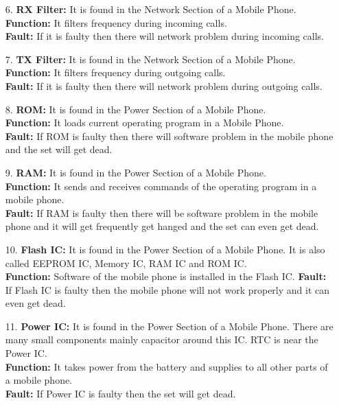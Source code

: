 \begin{itemize}
\item[6.] \textbf{RX Filter:} It is found in the Network Section of a Mobile Phone.\\
\textbf{Function:} It filters frequency during incoming calls.\\
\textbf{Fault:} If it is faulty then there will network problem during incoming
calls.

\item[7.] \textbf{TX Filter:} It is found in the Network Section of a Mobile Phone.\\
\textbf{Function:} It filters frequency during outgoing calls.\\
\textbf{Fault:} If it is faulty then there will network problem during outgoing calls.

\item[8.] \textbf{ROM:} It is found in the Power Section of a Mobile Phone.\\
\textbf{Function:} It loads current operating program in a Mobile Phone.\\
\textbf{Fault:} If ROM is faulty then there will software problem in the mobile phone and the set will get dead.

\item[9.] \textbf{RAM:} It is found in the Power Section of a Mobile Phone.\\
\textbf{Function:} It sends and receives commands of the operating program in a mobile phone.\\
\textbf{Fault:} If RAM is faulty then there will be software problem in the mobile phone and it will get frequently get hanged and the set can even get dead.

\item[10.] \textbf{Flash IC:} It is found in the Power Section of a Mobile Phone. It is also called EEPROM IC, Memory IC, RAM IC and ROM IC.\\
\textbf{Function:} Software of the mobile phone is installed in the Flash IC.
\textbf{Fault:} If Flash IC is faulty then the mobile phone will not work properly and it can even get dead.

\item[11.] \textbf{Power IC:} It is found in the Power Section of a Mobile Phone. There are many small components mainly capacitor around this IC. RTC is near the Power IC.\\
\textbf{Function:} It takes power from the battery and supplies to all other parts of a mobile phone.\\
\textbf{Fault:} If Power IC is faulty then the set will get dead.


\end{itemize}
